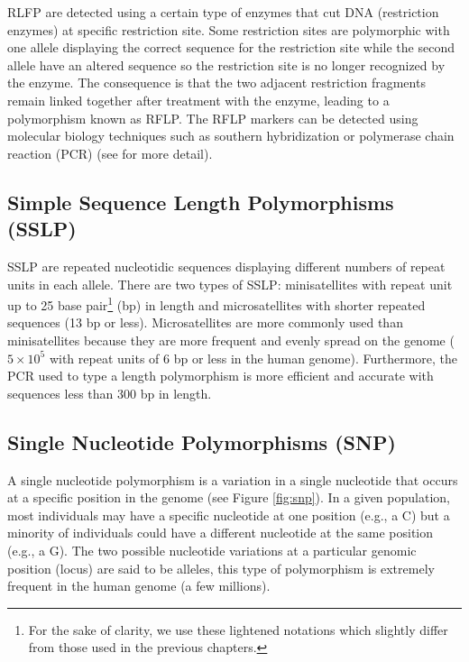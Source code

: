 \documentclass[]{book}
\let\rmarkdownfootnote\footnote%
\def\footnote{\protect\rmarkdownfootnote}
\begin{document}
RLFP are detected using a certain type of enzymes that cut DNA
(restriction enzymes) at specific restriction site. Some restriction
sites are polymorphic with one allele displaying the correct sequence
for the restriction site while the second allele have an altered
sequence so the restriction site is no longer recognized by the enzyme.
The consequence is that the two adjacent restriction fragments remain
linked together after treatment with the enzyme, leading to a
polymorphism known as RFLP. The RFLP markers can be detected using
molecular biology techniques such as southern hybridization or
polymerase chain reaction (PCR) (see \citep{garibyan2013research} for more
detail).

\hypertarget{simple-sequence-length-polymorphisms-sslp}{%
\subsection{Simple Sequence Length Polymorphisms (SSLP)}\label{simple-sequence-length-polymorphisms-sslp}}

SSLP are repeated nucleotidic sequences displaying different numbers of
repeat units in each allele. There are two types of SSLP: minisatellites
with repeat unit up to 25 base pair\footnote{For the sake of clarity, we use these lightened notations which
  slightly differ from those used in the previous chapters.} (bp) in length and
microsatellites with shorter repeated sequences (13 bp or less).
Microsatellites are more commonly used than minisatellites because they
are more frequent and evenly spread on the genome (\(5 \times 10^5\) with
repeat units of 6 bp or less in the human genome). Furthermore, the PCR
used to type a length polymorphism is more efficient and accurate with
sequences less than 300 bp in length.

\hypertarget{single-nucleotide-polymorphisms-snp}{%
\subsection{Single Nucleotide Polymorphisms (SNP)}\label{single-nucleotide-polymorphisms-snp}}

A single nucleotide polymorphism is a variation in a single nucleotide
that occurs at a specific position in the genome (see Figure \ref{fig:snp}). In a given population, most individuals may have a
specific nucleotide at one position (e.g., a C) but a minority of
individuals could have a different nucleotide at the same position
(e.g., a G). The two possible nucleotide variations at a particular
genomic position (locus) are said to be alleles, this type of
polymorphism is extremely frequent in the human genome (a few millions).
\end{document}

